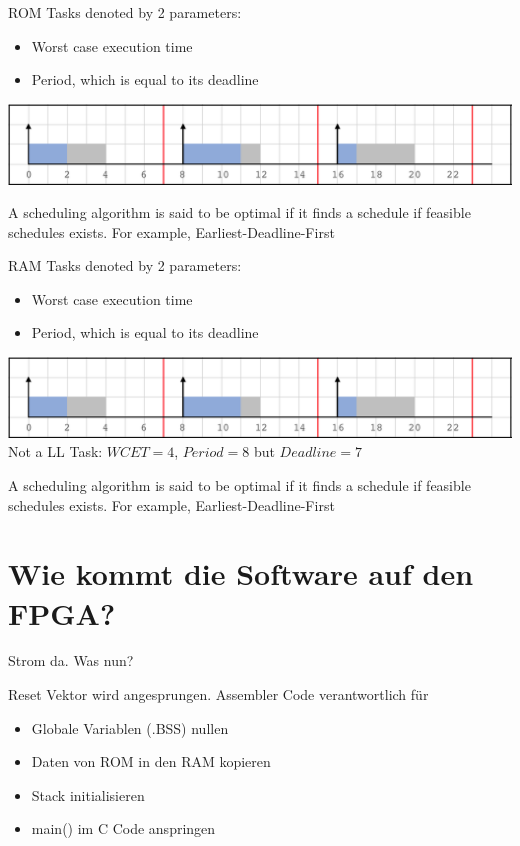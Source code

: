 \begin{frame}{ROM}
Tasks denoted by 2 parameters:
\begin{itemize}
\item Worst case execution time
\item Period, which is equal to its deadline
\end{itemize}
\begin{center}
\includegraphics[scale=0.36]{gantt-chart.png}
\end{center}

A scheduling algorithm is said to be optimal if it finds a schedule if feasible schedules exists. For example, Earliest-Deadline-First
\end{frame}

\begin{frame}{RAM}
Tasks denoted by 2 parameters:
\begin{itemize}
\item Worst case execution time
\item Period, which is equal to its deadline
\end{itemize}
\begin{center}
\includegraphics[scale=0.36]{gantt-chart.png} \\
Not a LL Task: $WCET= 4$, $Period = 8$ but $Deadline = 7$
\end{center}

A scheduling algorithm is said to be optimal if it finds a schedule if feasible schedules exists. For example, Earliest-Deadline-First
\end{frame}


\section{Wie kommt die Software auf den FPGA?}

\begin{frame}{Strom da. Was nun?}

Reset Vektor wird angesprungen. Assembler Code verantwortlich für

\begin{itemize}
\item Globale Variablen (.BSS) nullen
\item Daten von ROM in den RAM kopieren
\item Stack initialisieren
\item main() im C Code anspringen
\end{itemize}

\end{frame}


